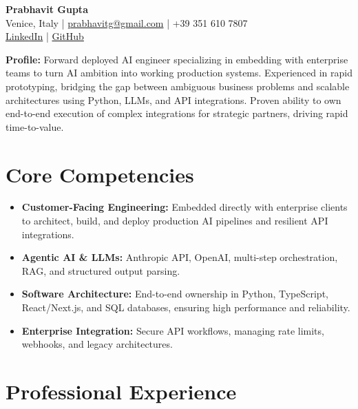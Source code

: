 \documentclass[11pt,a4paper]{article}
\begin{document}
\begin{center}
    {\Huge \textbf{Prabhavit Gupta}}\\[6pt]
    Venice, Italy | \href{mailto:prabhavitg@gmail.com}{prabhavitg@gmail.com} | +39 351 610 7807 \\
    \href{https://www.linkedin.com/in/prabhavit/}{LinkedIn} | \href{https://github.com/prab-gupta}{GitHub}
\end{center}

\vspace{10pt}

\noindent \textbf{Profile:} Forward deployed AI engineer specializing in embedding with enterprise teams to turn AI ambition into working production systems. Experienced in rapid prototyping, bridging the gap between ambiguous business problems and scalable architectures using Python, LLMs, and API integrations. Proven ability to own end-to-end execution of complex integrations for strategic partners, driving rapid time-to-value.

\section*{Core Competencies}
\begin{itemize}[leftmargin=*, noitemsep]
    \item \textbf{Customer-Facing Engineering:} Embedded directly with enterprise clients to architect, build, and deploy production AI pipelines and resilient API integrations.
    \item \textbf{Agentic AI \& LLMs:} Anthropic API, OpenAI, multi-step orchestration, RAG, and structured output parsing.
    \item \textbf{Software Architecture:} End-to-end ownership in Python, TypeScript, React/Next.js, and SQL databases, ensuring high performance and reliability.
    \item \textbf{Enterprise Integration:} Secure API workflows, managing rate limits, webhooks, and legacy architectures.
\end{itemize}

\section*{Professional Experience}
\end{document}
